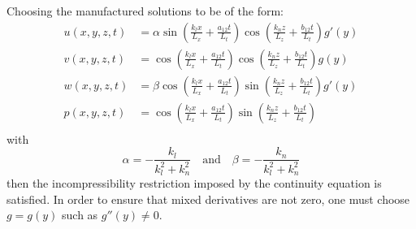\documentclass[10pt]{article}
\begin{document}
Choosing the manufactured solutions to be of the form:
\begin{equation}
\begin{split}\label{eq:uvw01}
u(x,y,z,t)&= \alpha \sin\left( \frac{k_l x}{L_x} + \frac{a_{12}t}{L_t} \right) \cos\left( \frac{k_n z}{L_z} + \frac{b_{12}t}{L_t} \right) g'(y)\\
v(x,y,z,t)&=        \cos\left( \frac{k_l x}{L_x} + \frac{a_{12}t}{L_t} \right) \cos\left( \frac{k_n z}{L_z} + \frac{b_{12}t}{L_t} \right) g(y)\\ 
w(x,y,z,t)&=  \beta \cos\left( \frac{k_l x}{L_x} + \frac{a_{12}t}{L_t} \right) \sin\left( \frac{k_n z}{L_z} + \frac{b_{12}t}{L_t} \right) g'(y)\\
p(x,y,z,t)&=  \cos\left( \frac{k_l x}{L_x} + \frac{a_{12}t}{L_t} \right) \sin\left( \frac{k_n z}{L_z} + \frac{b_{12}t}{L_t} \right) \\
\end{split}
\end{equation}
with
\begin{equation}\label{eq:ab01}
\alpha = -\dfrac{k_l}{k_l^2+ k_n^2}\quad\mbox{and}\quad \beta = -\dfrac{k_n}{k_l^2+ k_n^2} 
\end{equation}
then the incompressibility restriction imposed by the continuity equation is satisfied. In order to ensure that mixed derivatives are not zero, one must choose $g=g(y)$ such as $g''(y) \neq 0$.

% 
\end{document}
